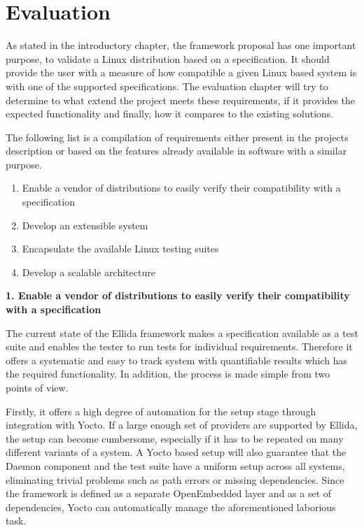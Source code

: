 \chapter{Evaluation}

As stated in the introductory chapter, the framework proposal has one important purpose, to validate a Linux distribution based on a specification. It should provide the user with a measure of how compatible a given Linux based system is with one of the supported specifications. The evaluation chapter will try to determine to what extend the project meets these requirements, if it provides the expected functionality and finally, how it compares to the existing solutions.

The following list is a compilation of requirements either present in the projects description or based on the features already available in software with a similar purpose.

\begin{enumerate}
\item Enable a vendor of distributions to easily verify their compatibility with a specification
\item Develop an extensible system
\item Encapsulate the available Linux testing suites
\item Develop a scalable architecture
\end{enumerate}


\textbf{1. Enable a vendor of distributions to easily verify their compatibility with a specification}

The current state of the Ellida framework makes a specification available as a test suite and enables the tester to run tests for individual requirements. Therefore it offers a systematic and easy to track system with quantifiable results which has the required functionality. In addition, the process is made simple from two points of view.

Firstly, it offers a high degree of automation for the setup stage through integration with Yocto. If a large enough set of providers are supported by Ellida, the setup can become cumbersome, especially if it has to be repeated on many different variants of a system. A Yocto based setup will also guarantee that the Daemon component and the test suite have a uniform setup across all systems, eliminating trivial problems such as path errors or missing dependencies. Since the framework is defined as a separate OpenEmbedded layer and as a set of dependencies, Yocto can automatically manage the aforementioned laborious task.

